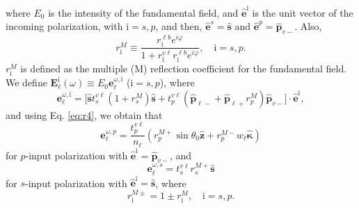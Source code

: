 \documentclass[aps,prb,10pt,showpacs,letterpaper,twocolumn]{revtex4-1}
\begin{document}
where $E_{0}$ is the intensity of the fundamental field, and
$\hat{\mathbf{e}}^{\mathrm{i}}$ is the unit vector of the incoming polarization,
with $\mathrm{i} = s,p$, and then, $\hat{\mathbf{e}}^{s}=\hat{\mathbf{s}}$ and
$\hat{\mathbf{e}}^{p}=\hat{\mathbf{p}}_{v-}$. Also,
\begin{equation}\label{mvrm}
r^{M}_{\mathrm{i}} \equiv
\frac{r^{\ell b}_{\mathrm{i}}e^{i\varphi}}{1+r^{v\ell}_{\mathrm{i}}
r^{\ell b}_{\mathrm{i}}e^{i\varphi}}, \quad \mathrm{i}=s,p.
\end{equation}
$r^{M}_{\mathrm{i}}$ is defined as the multiple (M) reflection coefficient for
the fundamental field. We define $\mathbf{E}^{\mathrm{i}}_{\ell}(\omega)\equiv
E_{0}\mathbf{e}^{\omega,\mathrm{i}}_{\ell}$ ($\mathrm{i}=s,p$), where
\begin{equation}\label{eq:mcvew2}
\mathbf{e}^{\omega,\mathrm{i}}_\ell 
= \Big[\hat{\mathbf{s}} t^{v\ell}_s(1+r^M_s)\hat{\mathbf{s}} 
+ t^{v\ell}_p\left(\hat{\mathbf{p}}_{\ell-}+\hat{\mathbf{p}}_{\ell+}r^{M}_p 
\right)\hat{\mathbf{p}}_{v-}
\Big]\cdot\hat{\mathbf{e}}^{\mathrm{i}},
\end{equation}
and using Eq. \eqref{eq:r4}, we obtain that
\begin{equation}\label{eq:mcvep}
\mathbf{e}^{\omega,p}_{\ell}=\frac{t^{v\ell}_{p}}{n_{\ell}}
\left( 
  r^{M+}_{p}\sin\theta_{0}\hat{\mathbf{z}}
+ r^{M-}_{p}w_{\ell}\hat{\boldsymbol{\kappa}}
\right)
\end{equation} 
for $p$-input polarization with $\hat{\mathbf{e}}^{\mathrm{i}} =
\hat{\mathbf{p}}_{v-}$, and
\begin{equation}\label{eq:mcves}
\mathbf{e}^{\omega,s}_\ell=t^{v\ell}_{s}r^{M+}_{s}\hat{\mathbf{s}}
\end{equation}
for $s$-input polarization with $\hat{\mathbf{e}}^{\mathrm{i}} =
\hat{\mathbf{s}}$, where
\begin{equation}\label{eq:mvc}
r^{M\pm}_{\mathrm{i}} = 1\pm r^{M}_{\mathrm{i}},\quad \mathrm{i} = s,p.
\end{equation}
\end{document}
